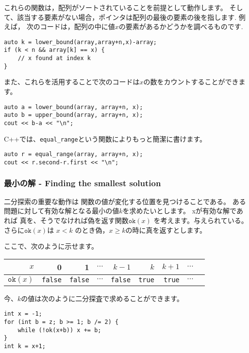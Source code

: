 これらの関数は，配列がソートされていることを前提として動作します。
そして、該当する要素がない場合，ポインタは配列の最後の要素の後を指します.
例えば， 次のコードは，配列の中に値$x$の要素があるかどうかを調べるものです.

\begin{lstlisting}
auto k = lower_bound(array,array+n,x)-array;
if (k < n && array[k] == x) {
    // x found at index k
}
\end{lstlisting}

また、これらを活用することで次のコードは$x$の数をカウントすることができます。

\begin{lstlisting}
auto a = lower_bound(array, array+n, x);
auto b = upper_bound(array, array+n, x);
cout << b-a << "\n";
\end{lstlisting}

C++では、\texttt{equal\_range}という関数によりもっと簡潔に書けます。

\begin{lstlisting}
auto r = equal_range(array, array+n, x);
cout << r.second-r.first << "\n";
\end{lstlisting}

\subsubsection{最小の解 - Finding the smallest solution}

二分探索の重要な動作は
関数の値が変化する位置を見つけることである。
ある問題に対して有効な解となる最小の値$k$を求めたいとします。
xが有効な解であれば 真を、そうでなければ偽を返す関数$\texttt{ok}(x)$
を考えます。与えられている。
さらに$\texttt{ok}(x)$は $x<k$ のとき偽，$x \ge k$の時に真を返すとします。

ここで、次のように示せます。

\begin{center}
\begin{tabular}{r|rrrrrrrr}
$x$ & 0 & 1 & $\cdots$ & $k-1$ & $k$ & $k+1$ & $\cdots$ \\
\hline
$\texttt{ok}(x)$ & \texttt{false} & \texttt{false}
& $\cdots$ & \texttt{false} & \texttt{true} & \texttt{true} & $\cdots$ \\
\end{tabular}
\end{center}

\noindent
今、$k$の値は次のように二分探査で求めることができます。

\begin{lstlisting}
int x = -1;
for (int b = z; b >= 1; b /= 2) {
    while (!ok(x+b)) x += b;
}
int k = x+1;
\end{lstlisting}

